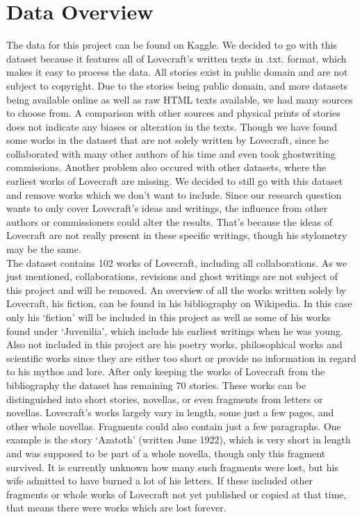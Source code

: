 \section{Data Overview}

The data for this project can be found on Kaggle. We decided to go with this dataset because 
it features all of Lovecraft’s written texts in .txt. format, which makes it easy to process 
the data. All stories exist in public domain and are not subject to copyright. Due to the 
stories being public domain, and more datasets being available online as well as raw HTML 
texts available, we had many sources to choose from. A comparison with other sources and 
physical prints of stories does not indicate any biases or alteration in the texts. Though 
we have found some works in the dataset that are not solely written by Lovecraft, since he 
collaborated with many other authors of his time and even took ghostwriting commissions. 
Another problem also occured with other datasets, where the earliest works of Lovecraft 
are missing. We decided to still go with this dataset and remove works which we don’t want 
to include. Since our research question wants to only cover Lovecraft’s ideas and writings, 
the influence from other authors or commissioners could alter the results. That’s because 
the ideas of Lovecraft are not really present in these specific writings, though his 
stylometry may be the same.\\

The dataset contains 102 works of Lovecraft, including all collaborations. As we just 
mentioned, collaborations, revisions and ghost writings are not subject of this project 
and will be removed. An overview of all the works written solely by Lovecraft, his fiction, 
can be found in his bibliography on Wikipedia. In this case only his ‘fiction’ will be 
included in this project as well as some of his works found under ‘Juvenilia’, which 
include his earliest writings when he was young. Also not included in this project are 
his poetry works, philosophical works and scientific works since they are either too 
short or provide no information in regard to his mythos and lore. After only keeping 
the works of Lovecraft from the bibliography the dataset has remaining 70 stories. 
These works can be distinguished into short stories, novellas, or even fragments from 
letters or novellas. Lovecraft’s works largely vary in length, some just a few pages, 
and other whole novellas. Fragments could also contain just a few paragraphs. One example 
is the story ‘Azatoth’ (written June 1922), which is very short in length and was 
supposed to be part of a whole novella, though only this fragment survived. It is currently 
unknown how many such fragments were lost, but his wife admitted to have burned a lot of 
his letters. If these included other fragments or whole works of Lovecraft not yet 
published or copied at that time, that means there were works which are lost forever.\\

